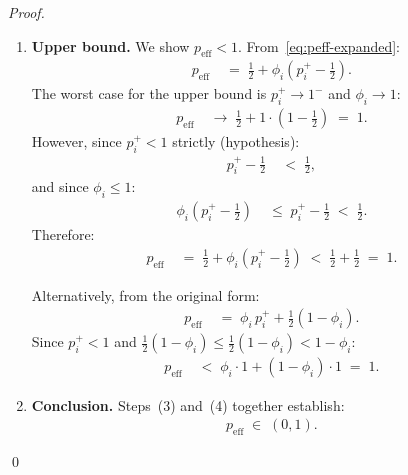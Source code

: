 \documentclass[12pt,openany]{book}
\numberwithin{equation}{chapter}
\theoremstyle{plain}
\theoremstyle{definition}
\theoremstyle{remark}
\numberwithin{equation}{chapter}
\theoremstyle{plain}
\begin{document}
\begin{proof}
\begin{enumerate}
  \item[\textup{(4)}] \textbf{Upper bound.}
        We show $p_{\mathrm{eff}} < 1$.
        From~\eqref{eq:peff-expanded}:
        \begin{align}
          p_{\mathrm{eff}}
          &\;=\; \tfrac{1}{2}
                 + \phi_i\!\left(p_i^+ - \tfrac{1}{2}\right).
          \label{eq:peff-ub-form}
        \end{align}
        The worst case for the upper bound is $p_i^+ \to 1^-$
        and $\phi_i \to 1$:
        \begin{align}
          p_{\mathrm{eff}}
          &\;\to\; \tfrac{1}{2} + 1 \cdot (1 - \tfrac{1}{2})
          \;=\; 1.
          \label{eq:peff-ub-limit}
        \end{align}
        However, since $p_i^+ < 1$ strictly (hypothesis):
        \begin{align}
          p_i^+ - \tfrac{1}{2}
          &\;<\; \tfrac{1}{2},
          \label{eq:peff-ub-step1}
        \end{align}
        and since $\phi_i \leq 1$:
        \begin{align}
          \phi_i\!\left(p_i^+ - \tfrac{1}{2}\right)
          &\;\leq\; p_i^+ - \tfrac{1}{2}
          \;<\; \tfrac{1}{2}.
          \label{eq:peff-ub-step2}
        \end{align}
        Therefore:
        \begin{align}
          p_{\mathrm{eff}}
          &\;=\; \tfrac{1}{2}
                 + \phi_i\!\left(p_i^+ - \tfrac{1}{2}\right)
          \;<\; \tfrac{1}{2} + \tfrac{1}{2}
          \;=\; 1.
          \label{eq:peff-ub-final}
        \end{align}

        Alternatively, from the original form:
        \begin{align}
          p_{\mathrm{eff}}
          &\;=\; \phi_i\,p_i^+
                 + \tfrac{1}{2}(1-\phi_i).
          \label{eq:peff-ub-alt}
        \end{align}
        Since $p_i^+ < 1$ and $\tfrac{1}{2}(1-\phi_i) \leq
        \tfrac{1}{2}(1-\phi_i) < 1-\phi_i$:
        \begin{align}
          p_{\mathrm{eff}}
          &\;<\; \phi_i \cdot 1 + (1-\phi_i) \cdot 1
          \;=\; 1.
          \label{eq:peff-ub-alt2}
        \end{align}

  \item[\textup{(5)}] \textbf{Conclusion.}
        Steps~(3) and~(4) together establish:
        \begin{align}
          p_{\mathrm{eff}} \;\in\; (0,1).
          \label{eq:peff-in-01}
        \end{align}
\end{enumerate}
\qed
\end{proof}
\end{document}
